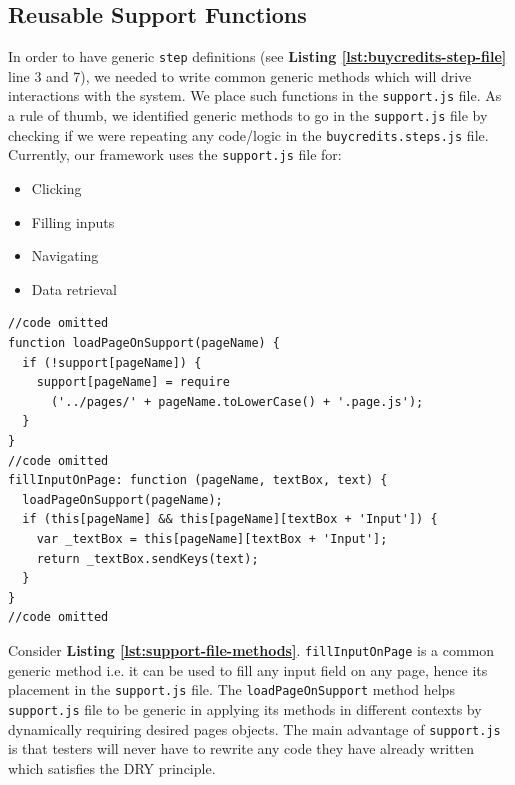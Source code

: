 \subsection{Reusable Support Functions}
\label{subsec:reusable-support-functions}

In order to have generic \texttt{step} definitions (see \textbf{Listing \ref{lst:buycredits-step-file}} line 3 and 7), we needed to write common generic methods which will drive interactions with the system. We place such functions in the \texttt{support.js} file. As a rule of thumb, we identified generic methods to go in the \texttt{support.js} file by checking if we were repeating any code/logic in the \texttt{buycredits.steps.js} file. Currently, our framework uses the \texttt{support.js} file for:

\begin{itemize}
\item Clicking
\item Filling inputs
\item Navigating
\item Data retrieval
\end{itemize}

\begin{listing}[H]
\begin{verbatim}
//code omitted
function loadPageOnSupport(pageName) {
  if (!support[pageName]) {
    support[pageName] = require
      ('../pages/' + pageName.toLowerCase() + '.page.js');
  }
}
//code omitted
fillInputOnPage: function (pageName, textBox, text) {
  loadPageOnSupport(pageName);
  if (this[pageName] && this[pageName][textBox + 'Input']) {
    var _textBox = this[pageName][textBox + 'Input'];
    return _textBox.sendKeys(text);
  }
}
//code omitted
\end{verbatim}
\label{lst:support-file-methods}
\end{listing}

Consider \textbf{Listing \ref{lst:support-file-methods}}. \texttt{fillInputOnPage} is a common generic method i.e. it can be used to fill any input field on any page, hence its placement in the \texttt{support.js} file. The \texttt{loadPageOnSupport} method helps \texttt{support.js} file to be generic in applying its methods in different contexts by dynamically requiring desired pages objects. The main advantage of \texttt{support.js} is that testers will never have to rewrite any code they have already written which satisfies the DRY principle.

